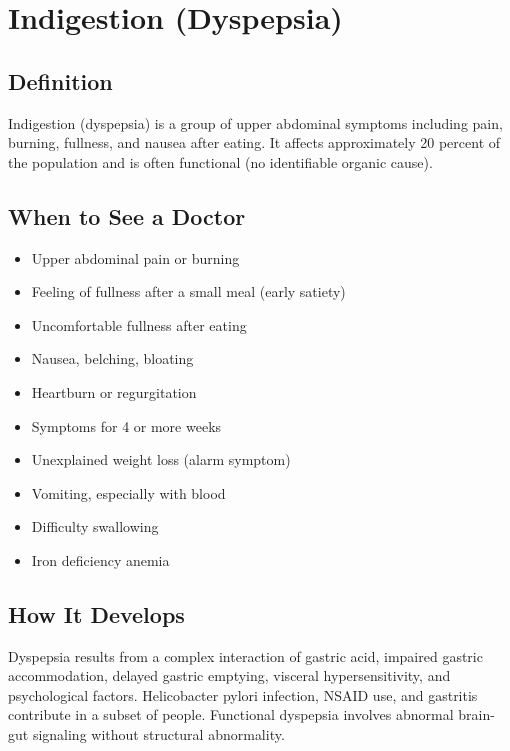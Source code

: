 \chapter{Indigestion (Dyspepsia)}

\section*{Definition}
Indigestion (dyspepsia) is a group of upper abdominal symptoms including pain, burning, fullness, and nausea after eating. It affects approximately 20 percent of the population and is often functional (no identifiable organic cause).

\section*{When to See a Doctor}
\begin{itemize}
\item Upper abdominal pain or burning
\item Feeling of fullness after a small meal (early satiety)
\item Uncomfortable fullness after eating
\item Nausea, belching, bloating
\item Heartburn or regurgitation
\item Symptoms for 4 or more weeks
\item Unexplained weight loss (alarm symptom)
\item Vomiting, especially with blood
\item Difficulty swallowing
\item Iron deficiency anemia
\end{itemize}

\section*{How It Develops}
Dyspepsia results from a complex interaction of gastric acid, impaired gastric accommodation, delayed gastric emptying, visceral hypersensitivity, and psychological factors. Helicobacter pylori infection, NSAID use, and gastritis contribute in a subset of people. Functional dyspepsia involves abnormal brain-gut signaling without structural abnormality.

